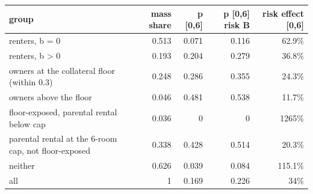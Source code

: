\begin{tabular}{lrrrr}
\toprule
group & mass share & p [0,6] & p [0,6] risk B & risk effect [0,6] \\
\midrule
renters, b = 0 & 0.513 & 0.071 & 0.116 & 62.9\% \\
renters, b > 0 & 0.193 & 0.204 & 0.279 & 36.8\% \\
owners at the collateral floor (within 0.3) & 0.248 & 0.286 & 0.355 & 24.3\% \\
owners above the floor & 0.046 & 0.481 & 0.538 & 11.7\% \\
floor-exposed, parental rental below cap & 0.036 & 0 & 0 & 1265\% \\
parental rental at the 6-room cap, not floor-exposed & 0.338 & 0.428 & 0.514 & 20.3\% \\
neither & 0.626 & 0.039 & 0.084 & 115.1\% \\
all & 1 & 0.169 & 0.226 & 34\% \\
\bottomrule
\end{tabular}
